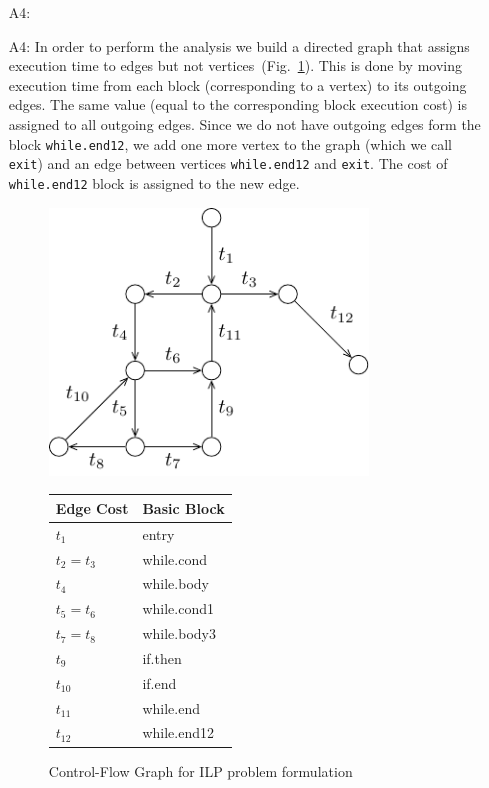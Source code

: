 \documentclass[12pt,a4paper,titlepage,oneside]{article}
\begin{document}
\begin{itemize}
\item[A4:] 
 \item[A4:]
In order to perform the analysis we build a directed graph that assigns execution time to edges but not vertices~(Fig.~\ref{fig:ilp}).
This is done by moving execution time from each block (corresponding to a vertex) to its outgoing edges.
The same value (equal to the corresponding block execution cost) is assigned to all outgoing edges.
Since we do not have outgoing edges form the block \texttt{while.end12}, we add one more vertex to the graph (which we call \texttt{exit}) and an edge between vertices \texttt{while.end12} and \texttt{exit}.
The cost of \texttt{while.end12} block is assigned to the new edge.
\begin{figure}
  \centering
  \begin{minipage}[c]{.6\linewidth}
    \centering
    \includegraphics[width=0.8\textwidth]{graph}
  \end{minipage}%
  \begin{minipage}[c]{.3\linewidth}
    \centering
    \small
	\begin{tabular}{l|l}
		\hline
		Edge Cost & Basic Block \\
		\hline
		$t_1$ & entry \\
		$t_2 = t_3$ & while.cond \\
		$t_4$ & while.body \\
		$t_5 = t_6$ & while.cond1 \\
		$t_7 = t_8$ & while.body3 \\
		$t_9$ & if.then \\
		$t_{10}$ & if.end \\
		$t_{11}$ & while.end \\
		$t_{12}$ & while.end12 \\
		\hline
	\end{tabular}
  \end{minipage}
  \caption{Control-Flow Graph for ILP problem formulation}
  \label{fig:ilp}
\end{figure}


\end{itemize}
\end{document}
